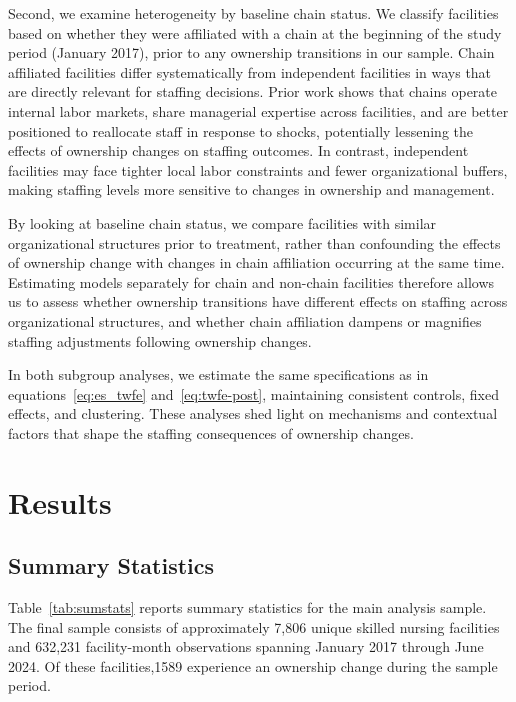 \documentclass[preprint,authoryear]{elsarticle}
\begin{document}
Second, we examine heterogeneity by baseline chain status. We classify facilities based on whether they were affiliated with a chain at the beginning of the study period (January 2017), prior to any ownership transitions in our sample. Chain affiliated facilities differ systematically from independent facilities in ways that are directly relevant for staffing decisions. Prior work shows that chains operate internal labor markets, share managerial expertise across facilities, and are better positioned to reallocate staff in response to shocks, potentially lessening the effects of ownership changes on staffing outcomes. In contrast, independent facilities may face tighter local labor constraints and fewer organizational buffers, making staffing levels more sensitive to changes in ownership and management.

By looking at baseline chain status, we compare facilities with similar organizational structures prior to treatment, rather than confounding the effects of ownership change with changes in chain affiliation occurring at the same time. Estimating models separately for chain and non-chain facilities therefore allows us to assess whether ownership transitions have different effects on staffing across organizational structures, and whether chain affiliation dampens or magnifies staffing adjustments following ownership changes.

In both subgroup analyses, we estimate the same specifications as in equations~\eqref{eq:es_twfe} and~\eqref{eq:twfe-post}, maintaining consistent controls, fixed effects, and clustering. These analyses shed light on mechanisms and contextual factors that shape the staffing consequences of ownership changes.

\section{Results}

\subsection{Summary Statistics}

Table~\ref{tab:sumstats} reports summary statistics for the main analysis sample. The final sample consists of approximately 7,806 unique skilled nursing facilities and 632,231 facility-month observations spanning January 2017 through June 2024. Of these facilities,1589 experience an ownership change during the sample period.


\FloatBarrier
\end{document}
